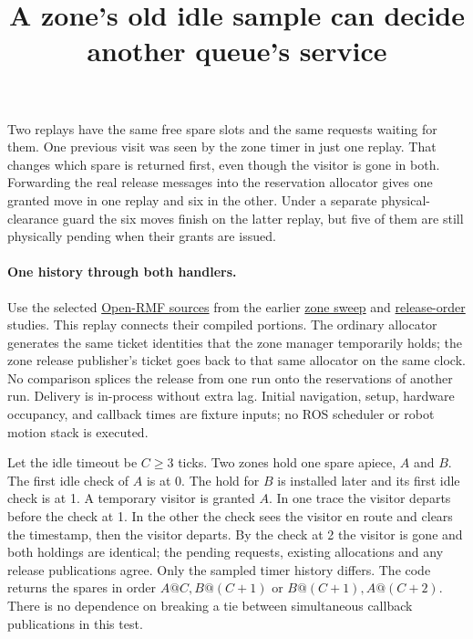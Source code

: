 \documentclass{article}
\title{A zone's old idle sample can decide another queue's service}
\begin{document}
\maketitle

Two replays have the same free spare slots and the same requests waiting for them. One previous visit was seen by the zone timer in just one replay. That changes which spare is returned first, even though the visitor is gone in both. Forwarding the real release messages into the reservation allocator gives one granted move in one replay and six in the other. Under a separate physical-clearance guard the six moves finish on the latter replay, but five of them are still physically pending when their grants are issued.

\paragraph{One history through both handlers.}
Use the selected \href{https://github.com/open-rmf/rmf_ros2/tree/16a3457196c6edf2f08a1ba4f497bf891404cbb7}{Open-RMF sources} from the earlier \href{https://github.com/eternal-november/eos-research-programmes/pull/451}{zone sweep} and \href{https://github.com/eternal-november/eos-research-programmes/pull/452}{release-order} studies. This replay connects their compiled portions. The ordinary allocator generates the same ticket identities that the zone manager temporarily holds; the zone release publisher's ticket goes back to that same allocator on the same clock. No comparison splices the release from one run onto the reservations of another run. Delivery is in-process without extra lag. Initial navigation, setup, hardware occupancy, and callback times are fixture inputs; no ROS scheduler or robot motion stack is executed.

Let the idle timeout be \(C\ge3\) ticks. Two zones hold one spare apiece, \(A\) and \(B\). The first idle check of \(A\) is at 0. The hold for \(B\) is installed later and its first idle check is at 1. A temporary visitor is granted \(A\). In one trace the visitor departs before the check at 1. In the other the check sees the visitor en route and clears the timestamp, then the visitor departs. By the check at 2 the visitor is gone and both holdings are identical; the pending requests, existing allocations and any release publications agree. Only the sampled timer history differs. The code returns the spares in order \(A@C,B@(C+1)\) or \(B@(C+1),A@(C+2)\). There is no dependence on breaking a tie between simultaneous callback publications in this test.
\end{document}
